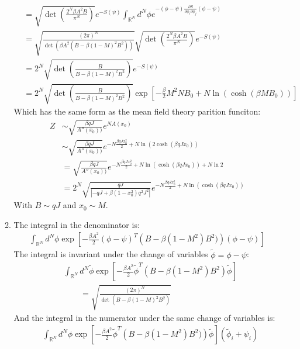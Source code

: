 \documentclass[12pt,a4]{article}
\begin{document}
\begin{enumerate}
\begin{enumerate}
\begin{align*}
            &= \sqrt{\det\left(\frac{2^N \beta A^2 B}{\pi^N}\right)} e^{-S(\psi)}\int_{\mathbb{R}^N} d^N \phi e^{ - (\phi - \psi) \frac{\partial S}{\partial \phi_i \partial \phi_j} (\phi - \psi)}\\
            &= \sqrt{\frac{(2 \pi)^N}{\det\left( \beta A^2(B  - \beta (1 - M)^2B^2)\right)}} \sqrt{\det\left(\frac{2^N \beta A^2 B}{\pi^N}\right)} e^{-S(\psi)}\\
            &= 2^N\sqrt{\det\left(\frac{ B}{ B  - \beta (1 - M)^2B^2}\right)} e^{-S(\psi)}\\
            &= 2^N\sqrt{\det\left(\frac{ B}{ B  - \beta (1 - M)^2B^2}\right)} \exp\left[-\frac{\beta}{2} M^2 N B_{0} + N \ln(\cosh(\beta M B_0))\right]
        \end{align*}
        Which has the same form as the mean field theory parition funciton:
        \begin{align*}
          Z &\sim \sqrt{\frac{\beta qJ}{A''(x_0))}} e^{NA(x_0)}\\
            &\sim \sqrt{\frac{\beta qJ}{A''(x_0))}} e^{-N\frac{\beta q J x_0^2}{2} + N \ln(2\cosh(\beta q J x_0))}\\
            &= \sqrt{\frac{\beta qJ}{A''(x_0))}} e^{-N\frac{\beta q J x_0^2}{2} + N \ln(\cosh(\beta q J x_0)) + N \ln 2}\\
            &= 2^N\sqrt{\frac{qJ}{|-q J + \beta (1 - x_0^2) q^2 J^2 |}} e^{-N\frac{\beta q J x_0^2}{2} + N \ln(\cosh(\beta q J x_0))}
        \end{align*}
        With $B \sim qJ$ and $x_0 \sim M$.
      \item
        The integral in the denominator is:
        \begin{align*}
          \int_{\mathbb{R}^N} d^N\phi \exp\left[-\frac{\beta A^2}{2}(\phi - \psi)^T\left(B  - \beta (1 - M^2)B^2)\right) (\phi - \psi)\right]
        \end{align*}
        The integral is invariant under the change of variables $\tilde\phi = \phi - \psi$:
        \begin{align*}
          &\int_{\mathbb{R}^N} d^N\tilde\phi \exp\left[-\frac{\beta A^2}{2}\tilde\phi^T\left(B  - \beta (1 - M^2)B^2\right) \tilde\phi\right]\\
          & \qquad = \sqrt{\frac{(2 \pi)^N}{\det\left( B  - \beta (1 - M)^2B^2\right)}}
        \end{align*}
        And the integral in the numerator under the same change of variables is:
        \begin{align*}
            &\int_{\mathbb{R}^N} d^N\phi \exp\left[-\frac{\beta A^2}{2}\tilde\phi^T\left(B  - \beta (1 - M^2)B^2)\right) \tilde\phi \right] (\tilde \phi_i + \psi_i)\\

\end{align*}
\end{enumerate}
\end{enumerate}
\end{document}
